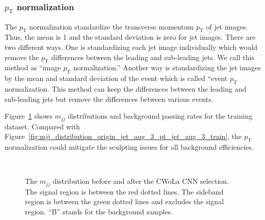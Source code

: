 \documentclass[12pt]{article}
\begin{document}
        \subsubsection{\texorpdfstring{$p_{\mathrm{T}}$}{pT} normalization}%
        \label{subs:pt_normalization}
            The $p_{\text{T}}$ normalization standardize the transverse momentum $p_{\text{T}}$ of jet images. Thus, the mean is 1 and the standard deviation is zero for jet images. There are two different ways. One is standardizing each jet image individually which would remove the $p_{\text{T}}$ differences between the leading and sub-leading jets. We call this method as ``image $p_{\text{T}}$ normalization.'' Another way is standardizing the jet images by the mean and standard deviation of the event which is called ``event $p_{\text{T}}$ normalization. This method can keep the differences between the leading and sub-leading jets but remove the differences between various events.

            Figure~\ref{fig:mjj_distribution_pt_normalized_origin_train} shows $m_{jj}$ distributions and background passing rates for the training dataset. Compared with Figure~\ref{fig:mjj_distribution_origin_jet_aug_3_pt_jet_aug_3_train}, the $p_{\text{T}}$ normalization could mitigate the sculpting issues for all background efficiencies.
            \begin{figure}[htpb]
                \centering
                 \\
                \caption{The $m_{jj}$ distribution before and after the CWoLa CNN selection. The signal region is between the red dotted lines. The sideband region is between the green dotted lines and excludes the signal region. ``B'' stands for the background samples.}
                \label{fig:mjj_distribution_pt_normalized_origin_train}
            \end{figure}
\end{document}
